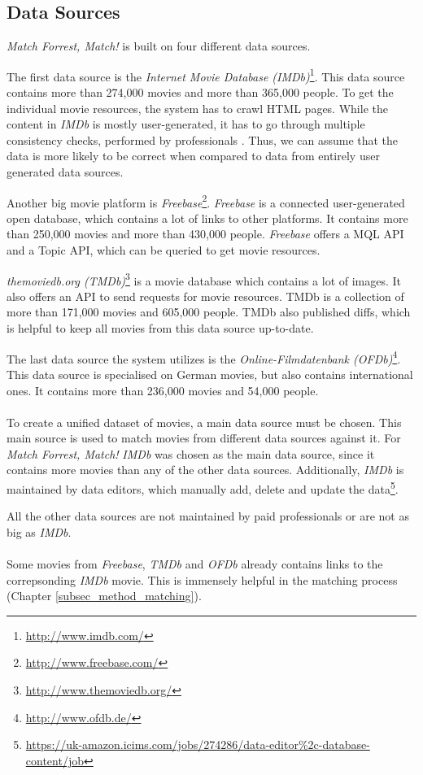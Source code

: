 \subsection{Data Sources}
\label{subsec_method_datasources}

\emph{Match Forrest, Match!} is built on four different data sources.

The first data source is the \textit{Internet Movie Database (IMDb)}\footnote{\url{http://www.imdb.com/}}.
This data source contains more than 274,000 movies and more than 365,000 people.
To get the individual movie resources, the system has to crawl HTML pages.
While the content in \textit{IMDb} is mostly user-generated, it has to go through multiple consistency checks, performed by professionals \cite{IMDb_DataCreation}.
Thus, we can assume that the data is more likely to be correct when compared to data from entirely user generated data sources.

Another big movie platform is \textit{Freebase}\footnote{\url{http://www.freebase.com/}}.
\textit{Freebase} is a connected user-generated open database, which contains a lot of links to other platforms.
It contains more than 250,000 movies and more than 430,000 people.
\textit{Freebase} offers a MQL API and a Topic API, which can be queried to get movie resources.

\textit{themoviedb.org (TMDb)}\footnote{\url{http://www.themoviedb.org/}} is a movie database which contains a lot of images.
It also offers an API to send requests for movie resources.
TMDb is a collection of more than 171,000 movies and 605,000 people.
TMDb also published diffs, which is helpful to keep all movies from this data source up-to-date.

The last data source the system utilizes is the \textit{Online-Filmdatenbank (OFDb)}\footnote{\url{http://www.ofdb.de/}}.
This data source is specialised on German movies, but also contains international ones.
It contains more than 236,000 movies and 54,000 people.
\\ \\
To create a unified dataset of movies, a main data source must be chosen.
This main source is used to match movies from different data sources against it.
For \emph{Match Forrest, Match!} \textit{IMDb} was chosen as the main data source, since it contains more movies than any of the other data sources.
Additionally, \textit{IMDb} is maintained by data editors, which manually add, delete and update the data\footnote{\url{https://uk-amazon.icims.com/jobs/274286/data-editor\%2c-database-content/job}}.

All the other data sources are not maintained by paid professionals or are not as big as \textit{IMDb}.
\\ \\
Some movies from \textit{Freebase}, \textit{TMDb} and \textit{OFDb} already contains links to the correpsonding \textit{IMDb} movie.
This is immensely helpful in the matching process (Chapter \ref{subsec_method_matching}).